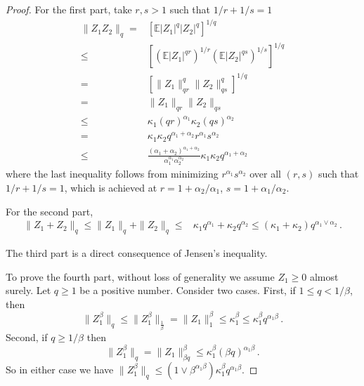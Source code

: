 \documentclass[11pt]{article}
\theoremstyle{plain}
\begin{document}
\begin{proof}
    For the first part, take $r,s>1$ such that $1/r+1/s=1$
    \begin{align*}
        \|Z_1 Z_2\|_q =& \left[\mathbb E |Z_1|^q |Z_2|^q\right]^{1/q}\\
        \le& \left[\left(\mathbb E |Z_1|^{qr}\right)^{1/r} \left(\mathbb E|Z_2|^{qs}\right)^{1/s}\right]^{1/q}\\
        =& \left[\|Z_1\|_{qr}^q\|Z_2\|_{qs}^q\right]^{1/q}\\
        =& \|Z_1\|_{qr}\|Z_2\|_{qs}\\
        \le & \kappa_1 (qr)^{\alpha_1}\kappa_2(qs)^{\alpha_2}\\
         = &\kappa_1\kappa_2 q^{\alpha_1+\alpha_2} r^{\alpha_1}s^{\alpha_2}\\
         \le & \frac{(\alpha_1+\alpha_2)^{\alpha_1+\alpha_2}}{\alpha_1^{\alpha_1}\alpha_2^{\alpha_2}}\kappa_1\kappa_2 q^{\alpha_1+\alpha_2}
    \end{align*}
    where the last inequality follows from minimizing $r^{\alpha_1}s^{\alpha_2}$ over all $(r,s)$ such that $1/r+1/s=1$, which is achieved at $r=1+\alpha_2/\alpha_1$, $s=1+\alpha_1/\alpha_2$.

    For the second part,
    \begin{align*}
        \|Z_1+Z_2\|_q\le \|Z_1\|_q+\|Z_2\|_q\le & \kappa_1 q^{\alpha_1}+\kappa_2 q^{\alpha_2}\le (\kappa_1+\kappa_2)q^{\alpha_1\vee\alpha_2}\,.
    \end{align*}

    The third part is a direct consequence of Jensen's inequality.

    To prove the fourth part, without loss of generality we assume $Z_1\ge 0$ almost surely. Let $q\ge 1$ be a positive number. Consider two cases.  First, if $1\le q < 1/\beta$, then
    $$\| Z_1^\beta\|_q\le \|Z_1^\beta\|_{\frac{1}{\beta}} = \|Z_1\|_1^\beta\le \kappa_1^\beta\le \kappa_1^\beta q^{\alpha_1\beta}\,.$$
    Second, if $q\ge 1/\beta$ then
    $$
    \|Z_1^\beta\|_q = \|Z_1\|_{\beta q}^\beta\le \kappa_1^\beta (\beta q)^{\alpha_1\beta}\,.
    $$
    So in either case we have $\|Z_1^\beta\|_q\le (1\vee\beta^{\alpha_1\beta} )\kappa_1^\beta q^{\alpha_1\beta}$.
\end{proof}
\end{document}
